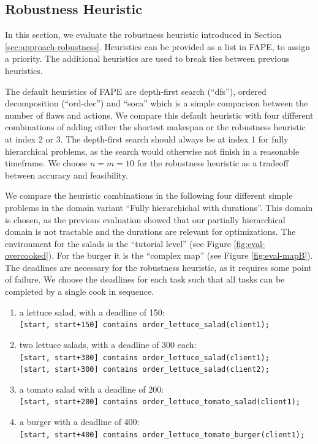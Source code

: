 \subsection{Robustness Heuristic}
\label{sec:evaluation-robustness}

In this section, we evaluate the robustness heuristic introduced in Section \ref{sec:approach-robustness}.
Heuristics can be provided as a list in \ac{FAPE}, to assign a priority.
The additional heuristics are used to break ties between previous heuristics.

The default heuristics of \ac{FAPE} are depth-first search (``dfs''), ordered decomposition (``ord-dec'') and ``soca'' which is a simple comparison between the number of flaws and actions.
We compare this default heuristic with four different combinations of adding either the shortest makespan or the robustness heuristic at index 2 or 3.
The depth-first search should always be at index 1 for fully hierarchical problems, as the search would otherwise not finish in a reasonable timeframe.
We choose $n=m=10$ for the robustness heuristic as a tradeoff between accuracy and feasibility.


We compare the heuristic combinations in the following four different simple problems in the domain variant ``Fully hierarchichal with durations''.
This domain is chosen, as the previous evaluation showed that our partially hierarchical domain is not tractable and the durations are relevant for optimizations.
The environment for the salads is the ``tutorial level'' (see Figure \ref{fig:eval-overcooked}).
For the burger it is the ``complex map'' (see Figure \ref{fig:eval-mapB}).
The deadlines are necessary for the robustness heuristic, as it requires some point of failure.
We choose the deadlines for each task such that all tasks can be completed by a single cook in sequence.
\begin{enumerate}
  \item a lettuce salad, with a deadline of 150:\\ 
    \verb|[start, start+150] contains order_lettuce_salad(client1);|
  \item two lettuce salads, with a deadline of 300 each:\\
    \verb|[start, start+300] contains order_lettuce_salad(client1);|\\
    \verb|[start, start+300] contains order_lettuce_salad(client2);|
  \item a tomato salad with a deadline of 200:\\
    \verb|[start, start+200] contains order_lettuce_tomato_salad(client1);|
  \item a burger with a deadline of 400:\\
    \verb|[start, start+400] contains order_lettuce_tomato_burger(client1);|
\end{enumerate}

